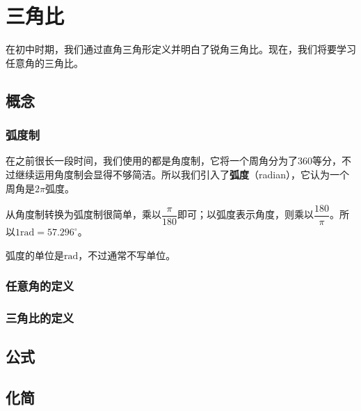 \chapter{三角比}
在初中时期，我们通过直角三角形定义并明白了锐角三角比。现在，我们将要学习任意角的三角比。

\section{概念}

\subsection{弧度制}
在之前很长一段时间，我们使用的都是角度制，它将一个周角分为了360等分，不过继续运用角度制会显得不够简洁。所以我们引入了\textbf{弧度}（radian），它认为一个周角是$2\pi$弧度。

从角度制转换为弧度制很简单，乘以$\dfrac{\pi}{180}$即可；以弧度表示角度，则乘以$\dfrac{180}{\pi}$。所以$1\mathrm{rad}=57.296^\circ$。

弧度的单位是$\mathrm{rad}$，不过通常不写单位。

\subsection{任意角的定义}

\subsection{三角比的定义}

\section{公式}

\section{化简}
